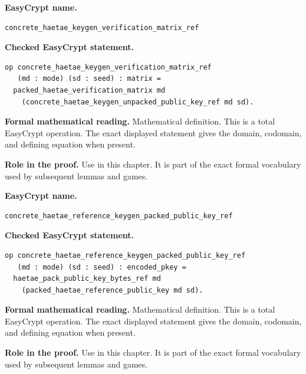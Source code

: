 \begin{formaldefinition}
\noindent\textbf{EasyCrypt name.}
\begin{lstlisting}[language=EasyCrypt,basicstyle=\ttfamily\scriptsize]
concrete_haetae_keygen_verification_matrix_ref
\end{lstlisting}
\noindent\textbf{Checked EasyCrypt statement.}
\begin{lstlisting}[language=EasyCrypt,basicstyle=\ttfamily\scriptsize]
op concrete_haetae_keygen_verification_matrix_ref
   (md : mode) (sd : seed) : matrix =
  packed_haetae_verification_matrix md
    (concrete_haetae_keygen_unpacked_public_key_ref md sd).
\end{lstlisting}
\noindent\textbf{Formal mathematical reading.}
Mathematical definition. This is a total EasyCrypt operation.  The exact displayed statement gives the domain, codomain, and defining equation when present.

\noindent\textbf{Role in the proof.}
Use in this chapter. It is part of the exact formal vocabulary used by subsequent lemmas and games.

\end{formaldefinition}

\begin{formaldefinition}
\noindent\textbf{EasyCrypt name.}
\begin{lstlisting}[language=EasyCrypt,basicstyle=\ttfamily\scriptsize]
concrete_haetae_reference_keygen_packed_public_key_ref
\end{lstlisting}
\noindent\textbf{Checked EasyCrypt statement.}
\begin{lstlisting}[language=EasyCrypt,basicstyle=\ttfamily\scriptsize]
op concrete_haetae_reference_keygen_packed_public_key_ref
   (md : mode) (sd : seed) : encoded_pkey =
  haetae_pack_public_key_bytes_ref md
    (packed_haetae_reference_public_key md sd).
\end{lstlisting}
\noindent\textbf{Formal mathematical reading.}
Mathematical definition. This is a total EasyCrypt operation.  The exact displayed statement gives the domain, codomain, and defining equation when present.

\noindent\textbf{Role in the proof.}
Use in this chapter. It is part of the exact formal vocabulary used by subsequent lemmas and games.

\end{formaldefinition}

